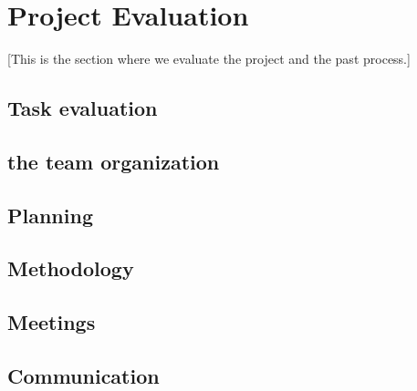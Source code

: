 \section{Project Evaluation}\label{Project Evaluation}
    [This is the section where we evaluate the project and the past process.]
    
    \subsection{Task evaluation}
    
    \subsection{ the team organization }
    \subsection{Planning}
    \subsection{Methodology}
    \subsection{ Meetings }
    \subsection{Communication}
    
